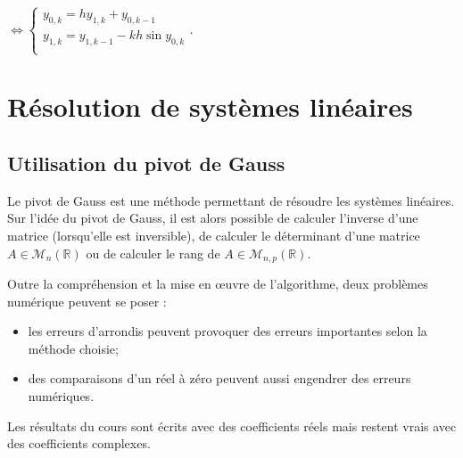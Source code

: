 \begin{itemize}[label=,font=\color{red}]
$\Leftrightarrow 
\left\{
\begin{array}{l}
y_{0,k} = h y_{1,k}+y_{0,k-1} \\
y_{1,k} = y_{1,k-1} - kh \sin y_{0,k} \\
\end{array}
\right.$.





\end{itemize}

\section{Résolution de systèmes linéaires}
\subsection{Utilisation du pivot de Gauss}

Le pivot de Gauss est une méthode permettant de résoudre les systèmes linéaires. Sur l'idée du pivot de Gauss, il est alors possible de calculer l'inverse d'une matrice (lorsqu'elle est inversible), de calculer le déterminant d'une matrice $A\in\mathcal{M}_n(\mathbb{R})$ ou de calculer le rang de 
$A\in\mathcal{M}_{n,p}(\mathbb{R})$.

Outre la compréhension et la mise en \oe{}uvre de l'algorithme, deux problèmes numérique peuvent se poser : 
\begin{itemize}
\item les erreurs d'arrondis peuvent provoquer des erreurs importantes selon la méthode choisie;
\item des comparaisons d'un réel à zéro peuvent aussi engendrer des erreurs numériques.
\end{itemize}

\begin{remarque}
Les résultats du cours sont écrits avec des coefficients réels mais restent vrais avec des coefficients complexes. 
\end{remarque}

